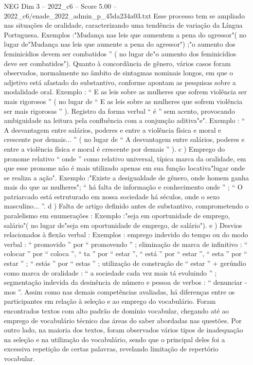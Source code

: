 \begin{textsample}{NEG Dim 3 – 2022\_c6 – Score 5.00 – 2022\_c6/enade\_2022\_admin\_p\_45da234a03.txt}
Esse processo tem se ampliado nas situações de oralidade, caracterizando uma tendência de variação da Língua Portuguesa.
Exemplos :"Mudança nas leis que aumentem a pena do agressor"( no lugar de"Mudança nas leis que aumente a pena do agressor") ;"o aumento dos feminicídios devem ser combatidos ” ( no lugar de"o aumento dos feminicídios deve ser combatidos").
Quanto à concordância de gênero, vários casos foram observados, normalmente no âmbito de sintagmas nominais longos, em que o adjetivo está afastado do substantivo, conforme apontam as pesquisas sobre a modalidade oral.
Exemplo : “ E as leis sobre as mulheres que sofrem violência ser mais rigorosos ” ( no lugar de “ E as leis sobre as mulheres que sofrem violência ser mais rigorosas ” ).
Registro da forma verbal “ é ” sem acento, provocando ambiguidade na leitura pela confluência com a conjunção aditiva"e".
Exemplo : “ A desvantagem entre salários, poderes e entre a violência física e moral e crescente por demais... ” ( no lugar de “ A desvantagem entre salários, poderes e entre a violência física e moral é crescente por demais ” ). c ) Emprego do pronome relativo “ onde ” como relativo universal, típica marca da oralidade, em que esse pronome não é mais utilizado apenas em sua função locativa"lugar onde se realiza a ação".
Exemplo :"Existe a desigualdade de gênero, onde homem ganha mais do que as mulheres"; “ há falta de informação e conhecimento onde ” ; “ O patriarcado está estruturado em nossa sociedade há séculos, onde o sexo masculino... ”. d ) Falta de artigo definido antes de substantivo, comprometendo o paralelismo em enumerações : Exemplo :"seja em oportunidade de emprego, salário"( no lugar de"seja em oportunidade de emprego, de salário"). e ) Desvios relacionados à flexão verbal : Exemplos : emprego indevido do tempo ou do modo verbal : “ promovido ” por “ promovendo ” ; eliminação de marca de infinitivo : “ colocar ” por “ coloca ”, “ ta ” por “ estar ”, “ está ” por “ estar ”, “ esta ” por “ estar ” ; “ estás ” por “ estas ” ; utilização de construção de “ estar ” + gerúndio como marca de oralidade : “ a sociedade cada vez mais tá evoluindo ” ; segmentação indevida da desinência de número e pessoa de verbos : “ denunciar -mos ”.
Assim como nas demais competências avaliadas, há diferenças entre os participantes em relação à seleção e ao emprego do vocabulário.
Foram encontrados textos com alto padrão de domínio vocabular, chegando até ao emprego de vocabulário técnico das áreas do saber abordadas nas questões.
Por outro lado, na maioria dos textos, foram observados vários tipos de inadequação na seleção e na utilização do vocabulário, sendo que o principal deles foi a excessiva repetição de certas palavras, revelando limitação de repertório vocabular.

\end{textsample}
